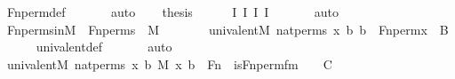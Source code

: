 \begin{isabellebody}
\ Fn{\isacharunderscore}{\kern0pt}perm{\isacharprime}{\kern0pt}{\isacharunderscore}{\kern0pt}def\ \isanewline
\ \ \ \ \isamarkupfalse%
\ auto\isanewline
\ \ \isamarkupfalse%
\ {\isacharquery}{\kern0pt}thesis\isanewline
\ \ \ \ \isamarkupfalse%
\ I{}\ I{}\ I{}\ I{}\ \isanewline
\ \ \ \ \isamarkupfalse%
\ auto\ \isanewline
{}\isamarkupfalse%
%
\endisatagproof
{\isafoldproof}%
%
\isadelimproof
\isanewline
%
\endisadelimproof
\isanewline
{}\isamarkupfalse%
\ Fn{\isacharunderscore}{\kern0pt}perms{\isacharunderscore}{\kern0pt}in{\isacharunderscore}{\kern0pt}M\ {\isacharcolon}{\kern0pt}\ {\isachardoublequoteopen}Fn{\isacharunderscore}{\kern0pt}perms\ {\isasymin}\ M{\isachardoublequoteclose}\ \isanewline
%
\isadelimproof
%
\endisadelimproof
%
\isatagproof
{}\isamarkupfalse%
\ {\isacharminus}{\kern0pt}\ \isanewline
\ \ \isamarkupfalse%
\ {\isachardoublequoteopen}univalent{\isacharparenleft}{\kern0pt}{\isacharhash}{\kern0pt}{\isacharhash}{\kern0pt}M{\isacharcomma}{\kern0pt}\ nat{\isacharunderscore}{\kern0pt}perms{\isacharcomma}{\kern0pt}\ {\isasymlambda}x\ b{\isachardot}{\kern0pt}\ b\ {\isacharequal}{\kern0pt}\ Fn{\isacharunderscore}{\kern0pt}perm{\isacharprime}{\kern0pt}{\isacharparenleft}{\kern0pt}x{\isacharparenright}{\kern0pt}{\isacharparenright}{\kern0pt}{\isachardoublequoteclose}\ {\isacharparenleft}{\kern0pt}\ {\isacharquery}{\kern0pt}B{\isacharparenright}{\kern0pt}\isanewline
\ \ \ \ \isamarkupfalse%
\ univalent{\isacharunderscore}{\kern0pt}def\ \isanewline
\ \ \ \ \isamarkupfalse%
\ auto\isanewline
\ \ \isamarkupfalse%
\ {\isachardoublequoteopen}univalent{\isacharparenleft}{\kern0pt}{\isacharhash}{\kern0pt}{\isacharhash}{\kern0pt}M{\isacharcomma}{\kern0pt}\ nat{\isacharunderscore}{\kern0pt}perms{\isacharcomma}{\kern0pt}\ {\isasymlambda}x\ b{\isachardot}{\kern0pt}\ {\isacharparenleft}{\kern0pt}M{\isacharcomma}{\kern0pt}\ {\isacharbrackleft}{\kern0pt}x{\isacharcomma}{\kern0pt}\ b{\isacharbrackright}{\kern0pt}\ {\isacharat}{\kern0pt}\ {\isacharbrackleft}{\kern0pt}Fn{\isacharbrackright}{\kern0pt}\ {\isasymTurnstile}\ is{\isacharunderscore}{\kern0pt}Fn{\isacharunderscore}{\kern0pt}perm{\isacharprime}{\kern0pt}{\isacharunderscore}{\kern0pt}fm{\isacharparenleft}{\kern0pt}{}{\isacharcomma}{\kern0pt}\ {}{\isacharcomma}{\kern0pt}\ {}{\isacharparenright}{\kern0pt}{\isacharparenright}{\kern0pt}{\isacharparenright}{\kern0pt}{\isachardoublequoteclose}\ {\isacharparenleft}{\kern0pt}\ {\isacharquery}{\kern0pt}C{\isacharparenright}{\kern0pt}\isanewline

\end{isabellebody}
